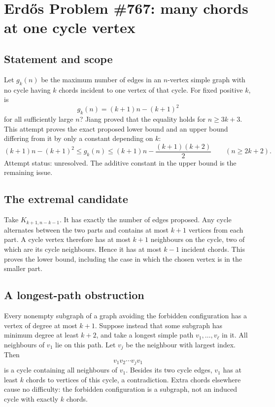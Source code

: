 \section*{Erd\H{o}s Problem \#767: many chords at one cycle vertex}
\subsection*{Statement and scope}
Let \(g_k(n)\) be the maximum number of edges in an \(n\)-vertex simple graph with no cycle having \(k\) chords incident to one vertex of that cycle. For fixed positive \(k\), is
\[
g_k(n)=(k+1)n-(k+1)^2
\]
for all sufficiently large \(n\)?
Jiang proved that the equality holds for \(n\geq3k+3\). This attempt proves the exact proposed lower bound and an upper bound differing from it by only a constant depending on \(k\):
\[
(k+1)n-(k+1)^2\leq g_k(n)
\leq(k+1)n-\frac{(k+1)(k+2)}2 \qquad(n\geq2k+2). \tag{1}
\]
Attempt status: unresolved. The additive constant in the upper bound is the remaining issue.

\subsection*{The extremal candidate}
Take \(K_{k+1,n-k-1}\). It has exactly the number of edges proposed. Any cycle alternates between the two parts and contains at most \(k+1\) vertices from each part. A cycle vertex therefore has at most \(k+1\) neighbours on the cycle, two of which are its cycle neighbours. Hence it has at most \(k-1\) incident chords. This proves the lower bound, including the case in which the chosen vertex is in the smaller part.

\subsection*{A longest-path obstruction}
Every nonempty subgraph of a graph avoiding the forbidden configuration has a vertex of degree at most \(k+1\). Suppose instead that some subgraph has minimum degree at least \(k+2\), and take a longest simple path \(v_1,\ldots,v_\ell\) in it. All neighbours of \(v_1\) lie on this path. Let \(v_j\) be the neighbour with largest index. Then
\[
v_1v_2\cdots v_jv_1
\]
is a cycle containing all neighbours of \(v_1\). Besides its two cycle edges, \(v_1\) has at least \(k\) chords to vertices of this cycle, a contradiction. Extra chords elsewhere cause no difficulty: the forbidden configuration is a subgraph, not an induced cycle with exactly \(k\) chords.


